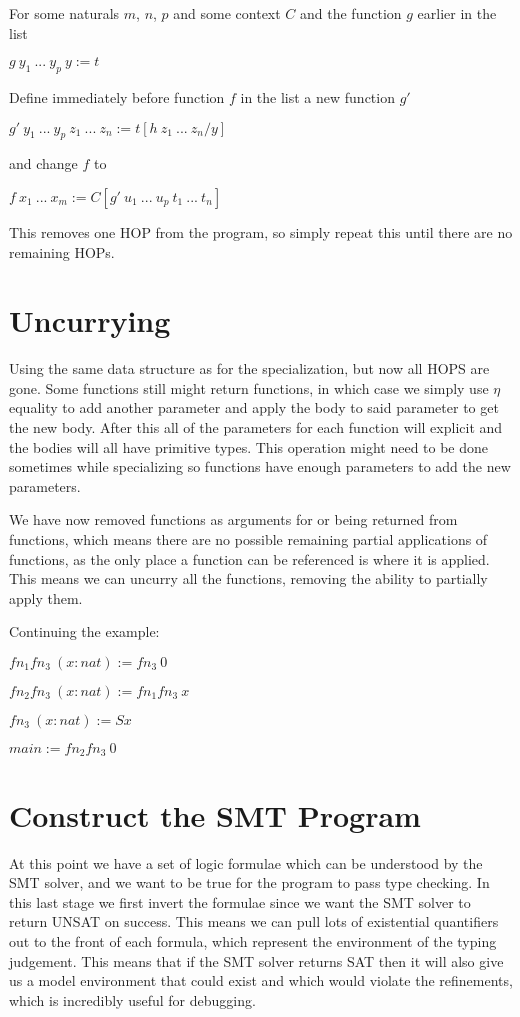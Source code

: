 \documentclass[12pt,a4paper,titlepage]{article}
\begin{document}
    For some naturals $m$, $n$, $p$ and some context $C$ and the function $g$ earlier in the list

    $g\ y_1\ ...\ y_p\ y := t$

    Define immediately before function $f$ in the list a new function $g'$

    $g'\ y_1\ ...\ y_p\ z_1\ ...\ z_n := t[h\ z_1\ ...\ z_n / y]$

    and change $f$ to

    $f\ x_1\ ...\ x_m := C[g'\ u_1\ ...\ u_p\ t_1\ ...\ t_n]$

    This removes one HOP from the program, so simply repeat this until there are no remaining HOPs.

    \section{Uncurrying}

    Using the same data structure as for the specialization, but now all HOPS are gone.
    Some functions still might return functions, in which case we simply use $\eta$ equality to add
    another parameter and apply the body to said parameter to get the new body.
    After this all of the parameters for each function will explicit and the bodies will all have
    primitive types. This operation might need to be done sometimes while specializing so functions have enough
    parameters to add the new parameters.

    We have now removed functions as arguments for or being returned from functions, which means there are no
    possible remaining partial applications of functions, as the only place a function can be referenced is where
    it is applied.
    This means we can uncurry all the functions, removing the ability to partially apply them.

    Continuing the example:

    $fn_1 fn_3\ (x: nat) := fn_3\ 0$

    $fn_2 fn_3\ (x: nat) := fn_1 fn_3\ x$

    $fn_3\ (x: nat) := S x$

    $main := fn_2 fn_3\ 0$

    \section{Construct the SMT Program}

    At this point we have a set of logic formulae which can be understood by the SMT solver, and we want to be
    true for the program to pass type checking.
    In this last stage we first invert the formulae since we want the SMT solver to return UNSAT on success.
    This means we can pull lots of existential quantifiers out to the front of each formula, which represent
    the environment of the typing judgement.
    This means that if the SMT solver returns SAT then it will also give us a model environment that could exist
    and which would violate the refinements, which is incredibly useful for debugging.
\end{document}
